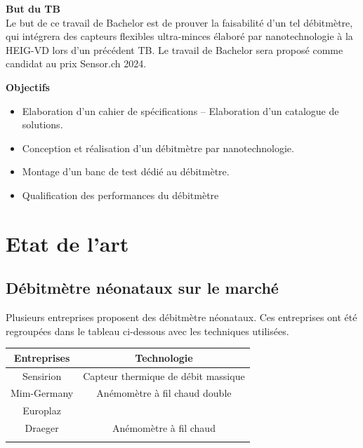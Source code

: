 \textbf{But du TB}\\
Le but de ce travail de Bachelor est de prouver la faisabilité d’un tel débitmètre, qui intégrera des capteurs flexibles ultra-minces 
élaboré par nanotechnologie à la HEIG-VD lors d'un précédent TB. Le travail de Bachelor sera proposé comme candidat au prix Sensor.ch 2024.

\textbf{Objectifs}
\begin{itemize}
    \item Elaboration d’un cahier de spécifications – Elaboration d’un catalogue de solutions.
    \item Conception et réalisation d’un débitmètre par nanotechnologie.
    \item Montage d’un banc de test dédié au débitmètre.
    \item Qualification des performances du débitmètre
\end{itemize}

\section{Etat de l'art}
\subsection{Débitmètre néonataux sur le marché}

Plusieurs entreprises proposent des débitmètre néonataux. Ces entreprises ont été regroupées dans le tableau ci-dessous avec les 
techniques utilisées. \\

\begin{centering}
    \begin{tabular}{|c|c|}
        \hline
        Entreprises & Technologie                         \\
        \hline
        Sensirion   & Capteur thermique de débit massique \\
        \hline
        Mim-Germany & Anémomètre à fil chaud double       \\
        \hline
        Europlaz    &                                     \\
        \hline
        Draeger     & Anémomètre à fil chaud              \\
        \hline
        \label{tab:marques}
    \end{tabular}
\end{centering}



